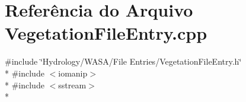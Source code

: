 \section{Referência do Arquivo Vegetation\+File\+Entry.\+cpp}
\label{_vegetation_file_entry_8cpp}
{\ttfamily \#include \char`\"{}Hydrology/\+W\+A\+S\+A/\+File Entries/\+Vegetation\+File\+Entry.\+h\char`\"{}}\\*
{\ttfamily \#include $<$iomanip$>$}\\*
{\ttfamily \#include $<$sstream$>$}\\*

